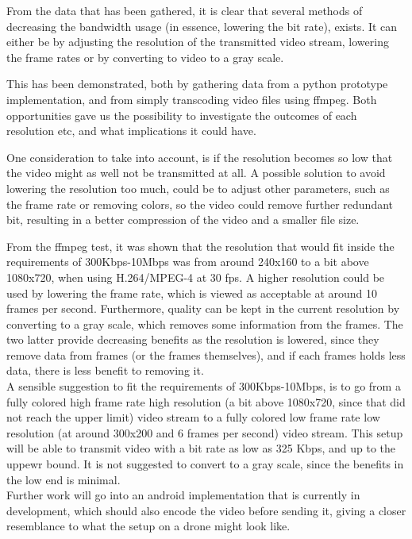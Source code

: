 From the data that has been gathered, it is clear that several methods of decreasing the bandwidth usage (in essence, lowering the bit rate), exists. It can either be by adjusting the resolution of the transmitted video stream, lowering the frame rates or by converting to video to a gray scale.

This has been demonstrated, both by gathering data from a python prototype implementation, and from simply transcoding video files using ffmpeg. Both opportunities gave us the possibility to investigate the outcomes of each resolution etc, and what implications it could have. 

One consideration to take into account, is if the resolution becomes so low that the video might as well not be transmitted at all. A possible solution to avoid lowering the resolution too much, could be to adjust other parameters, such as the frame rate or removing colors, so the video could remove further redundant bit, resulting in a better compression of the video and a smaller file size.

From the ffmpeg test, it was shown that the resolution that would fit inside the requirements of 300Kbps-10Mbps was from around 240x160 to a bit above 1080x720, when using H.264/MPEG-4 at 30 fps. A higher resolution could be used by lowering the frame rate, which is viewed as acceptable at around 10 frames per second. Furthermore, quality can be kept in the current resolution by converting to a gray scale, which removes some information from the frames. The two latter provide decreasing benefits as the resolution is lowered, since they remove data from frames (or the frames themselves), and if each frames holds less data, there is less benefit to removing it.\\

A sensible suggestion to fit the requirements of 300Kbps-10Mbps, is to go from a fully colored high frame rate high resolution (a bit above 1080x720, since that did not reach the upper limit) video stream to a fully colored low frame rate low resolution (at around 300x200 and 6 frames per second) video stream. This setup will be able to transmit video with a bit rate as low as 325 Kbps, and up to the uppewr bound. It is not suggested to convert to a gray scale, since the benefits in the low end is minimal.\\

Further work will go into an android implementation that is currently in development, which should also encode the video before sending it, giving a closer resemblance to what the setup on a drone might look like.
